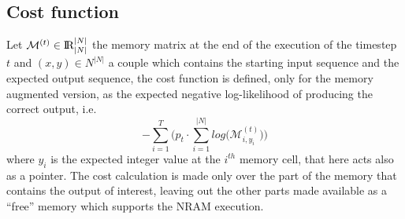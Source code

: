 \subsection{Cost function}\label{subsec:cost-function}
Let $\mathcal{M}^{(t)} \in \textrm{I\!R}^{|N|}_{|N|}$ the memory matrix at the end of the execution of the timestep $t$ and $(x, y) \in N^{|N|}$ a couple which contains the starting input sequence and the expected output sequence, the cost function is defined, only for the memory augmented version, as the expected negative log-likelihood of producing the correct output, i.e.
\begin{equation}
	-\sum\limits_{i=1}^{T}\Bigg(p_{t}\cdot\sum\limits_{i=1}^{|N|}log\Big(\mathcal{M}_{i, y_{i}}^{(t)}\Big)\Bigg)
\end{equation}
where $y_i$ is the expected integer value at the $i^{th}$ memory cell, that here acts also as a pointer. The cost calculation is made only over the part of the memory that contains the output of interest, leaving out the other parts made available as a ``free'' memory which supports the NRAM execution.